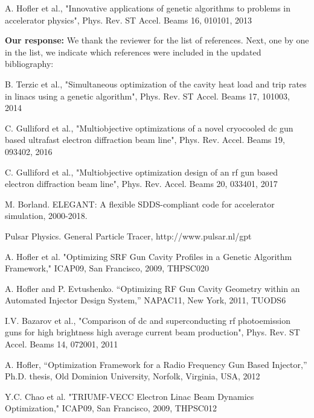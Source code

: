 \documentclass{article}
\begin{document}
	A. Hofler et al., "Innovative applications of genetic algorithms to
	problems in accelerator physics", Phys. Rev. ST Accel. Beams 16,
	010101, 2013
	
{\bf Our response:} {\color{blue} 	We thank the reviewer for the list of references. 
	Next, one by one in the list, we indicate which references were included in the updated bibliography: 
}


{\color{blue}{Included in updated bibliography (in addition to two references above):}}

B. Terzic et al., "Simultaneous optimization of the cavity heat load
and trip rates in linacs using a genetic algorithm", Phys. Rev. ST
Accel. Beams 17, 101003, 2014

C. Gulliford et al., "Multiobjective optimizations of a novel
cryocooled dc gun based ultrafast electron diffraction beam line",
Phys. Rev. Accel. Beams 19, 093402, 2016

C. Gulliford et al., "Multiobjective optimization design of an rf gun
based electron diffraction beam line", Phys. Rev. Accel. Beams 20,
033401, 2017

M. Borland. ELEGANT: A flexible SDDS-compliant code for accelerator simulation, 2000-2018.
{\color{blue}{(slightly updated this reference)}}

Pulsar Physics. General Particle Tracer, http://www.pulsar.nl/gpt

{\color{blue}{Exluded from updated bibliography, because they are in A. Hofler 13':}}

A. Hofler et al. "Optimizing SRF Gun Cavity Profiles in a Genetic
Algorithm Framework," ICAP09, San Francisco, 2009, THPSC020 


A. Hofler and P. Evtushenko. “Optimizing RF Gun Cavity Geometry within
an Automated Injector Design System,” NAPAC11, New York, 2011, TUODS6

I.V. Bazarov et al., "Comparison of dc and superconducting rf
photoemission guns for high brightness high average current beam
production", Phys. Rev. ST Accel. Beams 14, 072001, 2011

A. Hofler, “Optimization Framework for a Radio Frequency Gun Based
Injector,” Ph.D. thesis, Old Dominion University, Norfolk, Virginia,
USA, 2012

{\color{blue}{Excluded because of similarity to other references or scope of paper:}}

Y.C. Chao et al. "TRIUMF-VECC Electron Linac Beam Dynamics
Optimization," ICAP09, San Francisco, 2009, THPSC012
\end{document}
